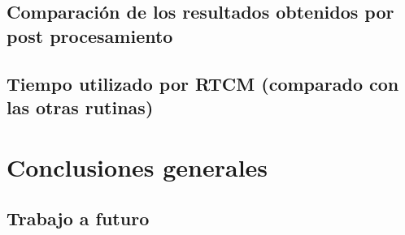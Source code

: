 \documentclass[a4paper,12pt,oneside,onecolumn,final,openright]{book}%
\begin{document}
\section{Comparación de los resultados obtenidos por post procesamiento}
\section{Tiempo utilizado por RTCM (comparado con las otras rutinas)}
\chapter*{Conclusiones generales}
	
\section*{Trabajo a futuro}
\end{document}
